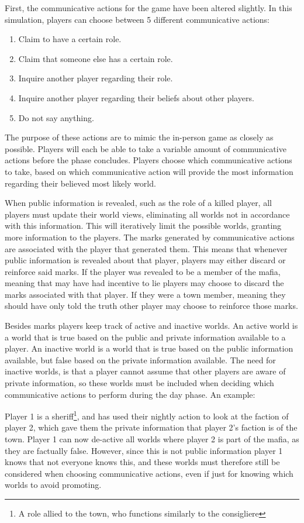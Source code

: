 First, the communicative actions for the game have been altered slightly. In
this simulation, players can choose between 5 different communicative actions:
\begin{enumerate}
	\itemsep0px
	\item \label{Com}Claim to have a certain role.
	\item Claim that someone else has a certain role.
	\item Inquire another player regarding their role.
	\item Inquire another player regarding their beliefs about other players.
	\item Do not say anything. \label{lst:communicativeActions}
\end{enumerate}
The purpose of these actions are to mimic the in-person game as closely as
possible. Players will each be able to take a variable amount of communicative actions before the
phase concludes. Players choose which communicative actions to take, based on which communicative action
will provide the most information regarding their believed most likely world.

When public information is revealed, such as the role of a killed player, all
players must update their world views, eliminating all worlds not in accordance
with this information. This will iteratively limit the possible worlds, granting
more information to the players. The marks generated by communicative actions are
associated with the player that generated them. This means that whenever public
information is revealed about that player, players may either discard or
reinforce said marks. If the player was revealed to be a
member of the mafia,  meaning that may have had incentive to lie players may choose to discard the marks associated with that player. If they
were a town member, meaning they should have only told the truth other player may choose to reinforce those marks.

Besides marks players keep track of active and inactive worlds.
An active world is a world that is true based on the public and private
information available to a player. An inactive world is a world that is true
based on the public information available, but false based on the private
information available. The need for inactive worlds, is that a player cannot
assume that other players are aware of private information, so these worlds
must be included when deciding which communicative actions to perform during
the day phase. An example:

Player 1 is a sheriff\footnote{A role allied to the town, who functions
	similarly to the consigliere}, and has used their nightly action to look at the
faction of player 2, which gave them the private information that player 2's
faction is of the town. Player 1 can now de-active all worlds where player 2 is part
of the mafia, as they are factually false. However, since this is not
public information player 1 knows that not everyone knows this, and these
worlds must therefore still be considered when choosing communicative actions,
even if just for knowing which worlds to avoid promoting.
